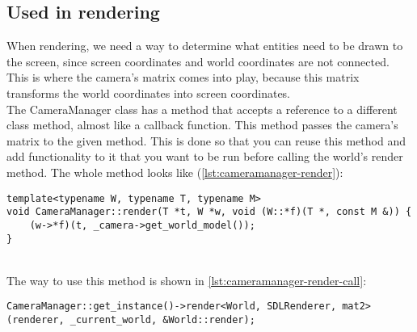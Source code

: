 \subsection{Used in rendering}

When rendering, we need a way to determine what entities need to be drawn to 
the screen, since screen coordinates and world coordinates are not connected. 
This is where the camera's matrix comes into play, because this matrix 
transforms the world coordinates into screen coordinates.
\\
The CameraManager class has a method that accepts a reference to a different 
class method, almost like a callback function. This method passes the 
camera's matrix to the given method. This is done so that you can reuse this 
method and add functionality to it that you want to be run before calling the 
world's render method. The whole method looks like 
(\cref{lst:cameramanager-render}):
\\
\begin{lstlisting}[caption={CameraManager render method.},
label={lst:cameramanager-render}]
template<typename W, typename T, typename M>
void CameraManager::render(T *t, W *w, void (W::*f)(T *, const M &)) {
    (w->*f)(t, _camera->get_world_model());
}
\end{lstlisting}
~\\
The way to use this method is shown in \cref{lst:cameramanager-render-call}:
\\
\begin{lstlisting}[caption={Using the CameraManager::render method.},
label={lst:cameramanager-render-call}]
CameraManager::get_instance()->render<World, SDLRenderer, mat2>(renderer, _current_world, &World::render);
\end{lstlisting}

